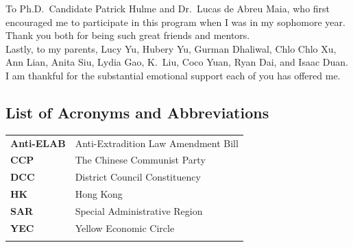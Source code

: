 \documentclass[letterpaper, 12pt]{article}
\begin{document}
\begin{titlepage}
To Ph.D.\ Candidate Patrick Hulme and Dr.\ Lucas de Abreu Maia, who first encouraged me to participate in this program when I was in my sophomore year. Thank you both for being such great friends and mentors.\\

Lastly, to my parents, Lucy Yu, Hubery Yu, Gurman Dhaliwal, Chlo Chlo Xu, Ann Lian, Anita Siu, Lydia Gao, K.\ Liu, Coco Yuan, Ryan Dai, and Isaac Duan. I am thankful for the substantial emotional support each of you has offered me.
\end{titlepage}







\setcounter{secnumdepth}{3}
\setcounter{tocdepth}{4}

\begin{titlepage}
\tableofcontents
\thispagestyle{empty}

\end{titlepage}



\begin{titlepage}
\listoffigures
\listoftables

\section*{List of Acronyms and Abbreviations}
\begin{table}[h!]
\centering\begingroup\fontsize{11}{12}\selectfont
\setlength\extrarowheight{2pt} 
\begin{tabularx}{\textwidth}{CC}
\textbf{Anti-ELAB} & Anti-Extradition Law Amendment Bill\\
\textbf{CCP} & The Chinese Communist Party\\
\textbf{DCC} & District Council Constituency\\
\textbf{HK} & Hong Kong\\
\textbf{SAR} & Special Administrative Region\\
\textbf{YEC} & Yellow Economic Circle\\

\thispagestyle{empty}



\end{tabularx}
\endgroup{}
\end{table}




\end{titlepage}
\end{document}
